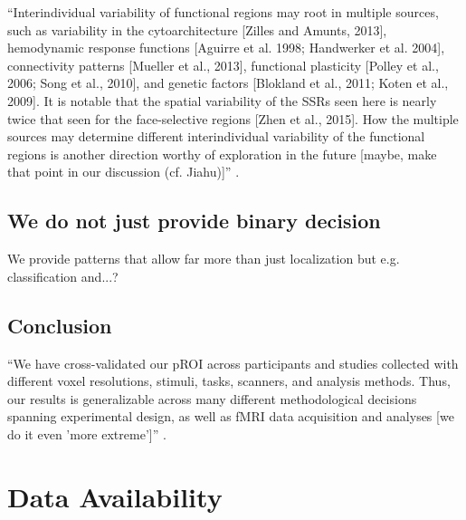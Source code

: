 ``Interindividual variability of functional regions may root in
multiple sources, such as variability in the cytoarchitecture [Zilles and
Amunts, 2013], hemodynamic response functions [Aguirre et al. 1998; Handwerker
et al. 2004], connectivity patterns [Mueller et al., 2013], functional
plasticity [Polley et al., 2006; Song et al., 2010], and genetic factors
[Blokland et al., 2011; Koten et al., 2009].
%
It is notable that the spatial variability of the SSRs seen here is nearly twice
that seen for the face-selective regions [Zhen et al., 2015]. How the multiple
sources may determine different interindividual variability of the functional
regions is another direction worthy of exploration in the future [maybe, make
that point in our discussion (cf. Jiahu)]'' \citep{zhen2017quantifying}.


\subsection{We do not just provide binary decision}
%
We provide patterns that allow far more than just localization but e.g.
classification and...?


\subsection{Conclusion}

``We have cross-validated our pROI across participants and studies collected
with different voxel resolutions, stimuli, tasks, scanners, and analysis
methods.
%
Thus, our results is generalizable across many different methodological
decisions spanning experimental design, as well as fMRI data acquisition and
analyses [we do it even 'more extreme']'' \citep{weiner2018defining}.


\section{Data Availability}



